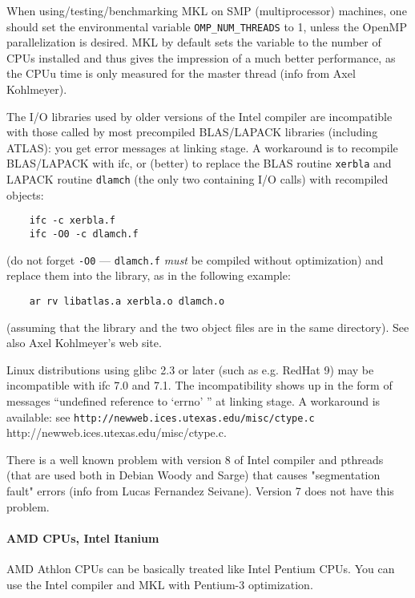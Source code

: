 \documentclass[12pt,a4paper]{article}
\begin{document}
When using/testing/benchmarking MKL on SMP (multiprocessor)
machines, one should set the environmental variable 
\texttt{OMP\_NUM\_THREADS} to 1, unless the OpenMP 
parallelization is desired. MKL by default sets the
variable to the number of CPUs installed and thus gives
the impression of a much better performance, as the CPUu time
is only measured for the master thread (info from Axel Kohlmeyer).

The I/O libraries used by older versions of the Intel compiler 
are incompatible 
with those called by most precompiled BLAS/LAPACK libraries 
(including ATLAS): you get error messages at linking stage.
A workaround is to recompile BLAS/LAPACK with ifc, or (better) to
replace the BLAS routine \texttt{xerbla} and LAPACK routine
\texttt{dlamch} (the only two containing I/O calls) with recompiled
objects:
\begin{verbatim}
    ifc -c xerbla.f
    ifc -O0 -c dlamch.f
\end{verbatim}
(do not forget \texttt{-O0} --- \texttt{dlamch.f} \emph{must} be
compiled without optimization) and replace them into the library, as
in the following example:
\begin{verbatim}
    ar rv libatlas.a xerbla.o dlamch.o
\end{verbatim}
(assuming that the library and the two object files are in the same
directory). See also Axel Kohlmeyer's web site.

Linux distributions using glibc 2.3 or later (such as e.g. RedHat 9)
may be incompatible with ifc 7.0 and 7.1.
The incompatibility shows up in the form of messages ``undefined
reference to `errno' '' at linking stage.
A workaround is available: see
\htmladdnormallink%
{\texttt{http://newweb.ices.utexas.edu/misc/ctype.c}}%
{http://newweb.ices.utexas.edu/misc/ctype.c}.

There is a well known problem with version 8 of Intel compiler and 
pthreads (that are used both in Debian Woody and Sarge) that causes
"segmentation fault" errors (info from Lucas Fernandez Seivane). 
Version 7 does not have this problem.

\paragraph{AMD CPUs, Intel Itanium}

AMD Athlon CPUs can be basically treated like Intel Pentium CPUs.
You can use the Intel compiler and MKL with Pentium-3 optimization.
\end{document}
